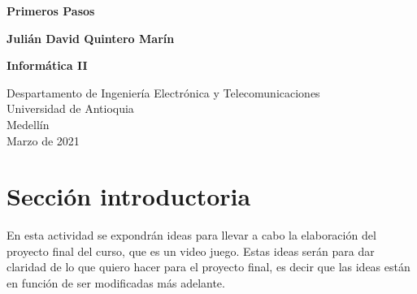 \documentclass{article}
\begin{document}
\begin{titlepage}
    \begin{center}
        \vspace*{1cm}
            
        \Huge
        \textbf{Primeros Pasos}
            
        \vspace{0.5cm}
        \LARGE
        
            
        \vspace{1.5cm}
            
        \textbf{Julián David Quintero Marín}
        \newline
        \newline
        \newline
        \newline

        
        
        \textbf{Informática II}
        
        \vfill
            
        \vspace{0.8cm}
  
        \Large
        Despartamento de Ingeniería Electrónica y Telecomunicaciones\\
        Universidad de Antioquia\\
        Medellín\\
        Marzo de 2021
            
    \end{center}
\end{titlepage}

\tableofcontents
\newpage
\section{Sección introductoria}\label{intro}
En esta actividad se expondrán ideas para llevar a cabo la elaboración del proyecto final del curso, que es un video juego. Estas ideas serán para dar claridad de lo que quiero hacer para el proyecto final, es decir que las ideas están en función de ser modificadas más adelante.
\end{document}
